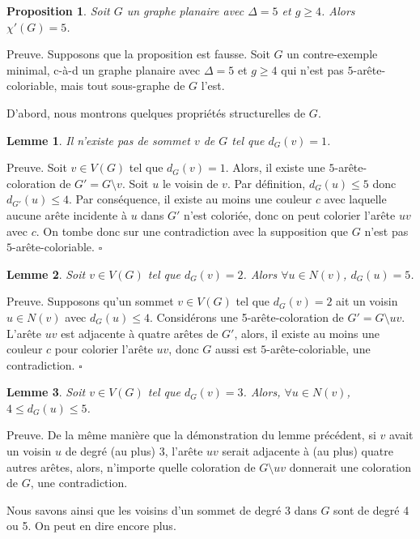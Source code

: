 \documentclass[10pt,a4paper]{article}
\newtheorem{proposition}{Proposition}
\newtheorem{lemme}{Lemme}
\newcommand{\ep}{{\hfill $\square$}}
\begin{document}
\begin{proposition}
Soit $G$ un graphe planaire avec $\Delta = 5$ et $g \geq 4$. Alors $\chi'(G)=5$.
\end{proposition}

Preuve. Supposons que la proposition est fausse. Soit $G$ un contre-exemple minimal, c-à-d un graphe planaire avec $\Delta = 5$ et $g \geq 4$ qui n'est pas $5$-arête-coloriable, mais tout sous-graphe de $G$ l'est.

D'abord, nous montrons quelques propriétés structurelles de $G$.

\begin{lemme}
Il n'existe pas de sommet $v$ de $G$ tel que $d_G(v) = 1$.
\label{le:1}
\end{lemme}

Preuve. Soit $v \in V(G)$ tel que $d_G(v) = 1$. Alors, il existe une $5$-arête-coloration de $G'=G \setminus v$. Soit $u$ le voisin de $v$. Par définition, $d_G(u) \leq 5$ donc $d_{G'}(u) \leq 4$. Par conséquence, il existe au moins une couleur $c$ avec laquelle aucune arête incidente à $u$ dans $G'$ n'est coloriée, donc on peut colorier l'arête $uv$ avec $c$. On tombe donc sur une contradiction avec la supposition que $G$ n'est pas $5$-arête-coloriable.
\ep

\begin{lemme}
Soit $v \in V(G)$ tel que $d_G(v) = 2$. Alors $\forall u \in N(v)$, $d_G(u) = 5$.
\label{le:2}
\end{lemme}

Preuve.
Supposons qu'un sommet $v \in V(G)$ tel que $d_G(v) = 2$ ait un voisin $u \in N(v)$ avec $d_G(u)  \le 4$. Considérons une 5-arête-coloration de $G' = G \setminus uv$.
L'arête $uv$ est adjacente à quatre arêtes de $G'$, alors, il existe au moins une couleur $c$ pour colorier l'arête $uv$, donc $G$ aussi est $5$-arête-coloriable,  une contradiction.
\ep


\begin{lemme}
Soit $v\in V(G)$ tel que $d_G(v) = 3$. Alors, $\forall u \in N(v)$, $4\le d_G(u) \le 5$.
\label{le:33}
\end{lemme}

Preuve. De la même manière que la démonstration du lemme précédent, si $v$ avait un voisin $u$ de degré (au plus) 3, l'arête $uv$ serait adjacente à (au plus) quatre autres arêtes, alors, n'importe quelle coloration de $G\setminus uv$ donnerait une coloration de $G$, une contradiction.

Nous savons ainsi que les voisins d'un sommet de degré 3 dans $G$ sont de degré 4 ou 5. On peut en dire encore plus.
\end{document}
